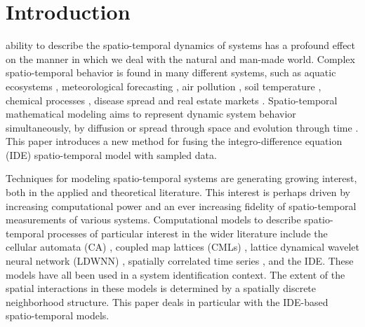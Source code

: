 \documentclass[10pt,twocolumn,twoside]{IEEEtran}
\begin{document}
%
\IEEEpeerreviewmaketitle



\section{Introduction}
 ability to describe the spatio-temporal dynamics of systems has a profound effect on the manner in which we deal with the natural and man-made world. Complex spatio-temporal behavior is found in many different systems, such as aquatic ecosystems \cite{Schofield2002}, meteorological forecasting \cite{Xu2005}, air pollution \cite{Romanowicz2006}, soil temperature  \cite{Bond-Lamberty2005}, chemical processes \cite{Deng2005}, disease spread \cite{Kuo2009} and real estate markets \cite{Pace2000,Sun2005}. Spatio-temporal mathematical modeling aims to represent dynamic system behavior simultaneously, by diffusion or spread through space and evolution through time \cite{Cressie2011}. This paper introduces a new method for fusing the integro-difference equation (IDE) spatio-temporal model with sampled data. %

Techniques for modeling spatio-temporal systems are generating growing interest, both in the applied and theoretical literature. This interest is perhaps driven by increasing computational power and an ever increasing fidelity of spatio-temporal measurements of various systems. Computational models to describe spatio-temporal processes of particular interest in the wider literature include the cellular automata (CA) \cite{Wolfram1994}, coupled map lattices (CMLs) \cite{Billings2002}, lattice dynamical wavelet neural network (LDWNN) \cite{Wei2009}, spatially correlated time series \cite{Pfeifer1980,Glasbey2008,Dewar2007}, and the IDE. These models have all been used in a system identification context. The extent of the spatial interactions in these models is determined by a spatially discrete neighborhood structure. This paper deals in particular with the IDE-based spatio-temporal models. 
\end{document}
